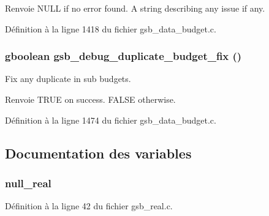 \begin{DoxyReturn}{Renvoie}
NULL if no error found. A string describing any issue if any. 
\end{DoxyReturn}


Définition à la ligne 1418 du fichier gsb\_\-data\_\-budget.c.

\subsubsection[{gsb\_\-debug\_\-duplicate\_\-budget\_\-fix}]{\setlength{\rightskip}{0pt plus 5cm}gboolean gsb\_\-debug\_\-duplicate\_\-budget\_\-fix ()}\label{gsb__data__budget_8c_a2ed32cf7e76ee11f9524934bd1550f5d}
Fix any duplicate in sub budgets.

\begin{DoxyReturn}{Renvoie}
TRUE on success. FALSE otherwise. 
\end{DoxyReturn}


Définition à la ligne 1474 du fichier gsb\_\-data\_\-budget.c.



\subsection{Documentation des variables}
\subsubsection[{null\_\-real}]{ {\bf null\_\-real}}\label{gsb__data__budget_8c_a26f304bec3fdc0651b9aa8765d4de3c6}


Définition à la ligne 42 du fichier gsb\_\-real.c.

